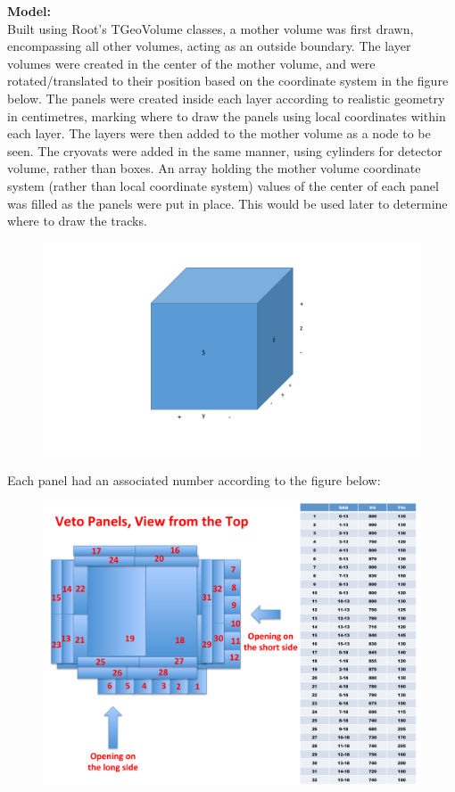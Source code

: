 \documentclass[a4paper,12pt]{article}
\begin{document}
\textbf{Model:} \\
Built using Root's TGeoVolume classes, a mother volume was first drawn, encompassing all other volumes, acting as an outside boundary. The layer volumes were created in the center of the mother volume, and were rotated/translated to their position based on the coordinate system in the figure below. The panels were created inside each layer according to realistic geometry in centimetres, marking where to draw the panels using local coordinates within each layer. The layers were then added to the mother volume as a node to be seen. The cryovats were added in the same manner, using cylinders for detector volume, rather than boxes. An array holding the mother volume coordinate system (rather than local coordinate system) values of the center of each panel was filled as the panels were put in place. This would be used later to determine where to draw the tracks.

\begin{figure}[h]
\centering
\includegraphics[scale=0.3]{Coordinatesystem.pdf}
\end{figure}

Each panel had an associated number according to the figure below:

\begin{figure}[h]
\centering
\includegraphics[scale=0.3]{Panels_2015.pdf}
\end{figure}
\end{document}
